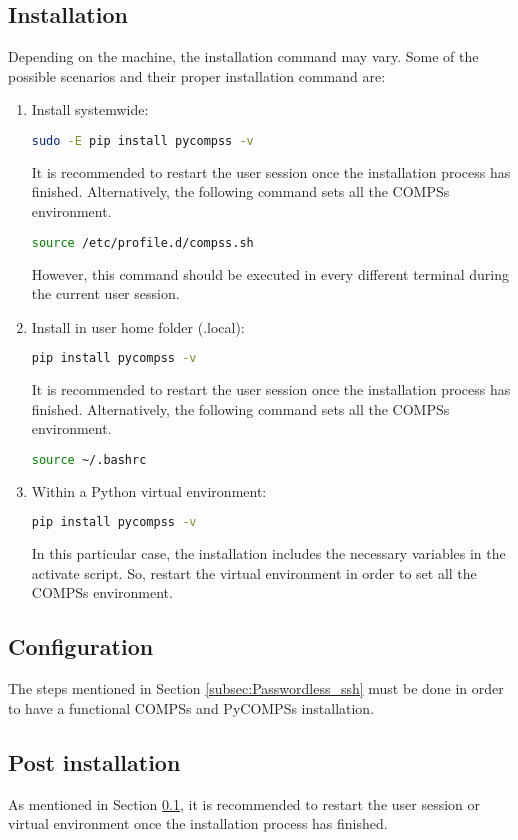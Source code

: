 \subsection{Installation}
\label{subsec:pip_installation}
Depending on the machine, the installation command may vary. Some of the possible scenarios and their proper installation command are:
\begin{enumerate}

\item Install systemwide:
 \begin{lstlisting}[language=bash]
 sudo -E pip install pycompss -v
 \end{lstlisting}
 It is recommended to restart the user session once the installation process has finished.
Alternatively, the following command sets all the COMPSs environment.
\begin{lstlisting}[language=bash]
source /etc/profile.d/compss.sh
\end{lstlisting}
However, this command should be executed in every different terminal during the current user session.

 \item Install in user home folder (.local):
 \begin{lstlisting}[language=bash]
 pip install pycompss -v
 \end{lstlisting}
 It is recommended to restart the user session once the installation process has finished.
Alternatively, the following command sets all the COMPSs environment.
\begin{lstlisting}[language=bash]
source ~/.bashrc
\end{lstlisting}
 
 \item Within a Python virtual environment:
\begin{lstlisting}[language=bash]
 pip install pycompss -v
\end{lstlisting}
In this particular case, the installation includes the necessary variables in the activate script.
So, restart the virtual environment in order to set all the COMPSs environment.

\end{enumerate}



\subsection{Configuration}
\label{subsec:pip_configuration}
The steps mentioned in Section \ref{subsec:Passwordless_ssh} must be done in order to have a functional COMPSs and PyCOMPSs installation.


\subsection{Post installation}
As mentioned in Section \ref{subsec:pip_installation}, it is recommended to restart the user session or virtual environment once the installation process has finished.
